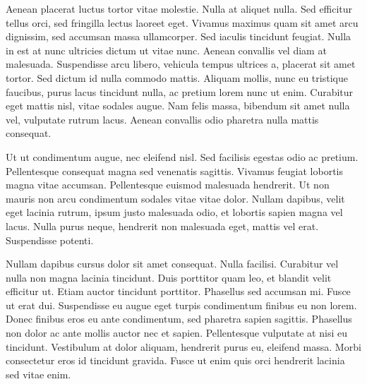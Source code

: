 \documentclass[
  a4paper,
  DIV=11,
  numbers=noendperiod]{scrreprt}
\begin{document}
Aenean placerat luctus tortor vitae molestie. Nulla at aliquet nulla.
Sed efficitur tellus orci, sed fringilla lectus laoreet eget. Vivamus
maximus quam sit amet arcu dignissim, sed accumsan massa ullamcorper.
Sed iaculis tincidunt feugiat. Nulla in est at nunc ultricies dictum ut
vitae nunc. Aenean convallis vel diam at malesuada. Suspendisse arcu
libero, vehicula tempus ultrices a, placerat sit amet tortor. Sed dictum
id nulla commodo mattis. Aliquam mollis, nunc eu tristique faucibus,
purus lacus tincidunt nulla, ac pretium lorem nunc ut enim. Curabitur
eget mattis nisl, vitae sodales augue. Nam felis massa, bibendum sit
amet nulla vel, vulputate rutrum lacus. Aenean convallis odio pharetra
nulla mattis consequat.

Ut ut condimentum augue, nec eleifend nisl. Sed facilisis egestas odio
ac pretium. Pellentesque consequat magna sed venenatis sagittis. Vivamus
feugiat lobortis magna vitae accumsan. Pellentesque euismod malesuada
hendrerit. Ut non mauris non arcu condimentum sodales vitae vitae dolor.
Nullam dapibus, velit eget lacinia rutrum, ipsum justo malesuada odio,
et lobortis sapien magna vel lacus. Nulla purus neque, hendrerit non
malesuada eget, mattis vel erat. Suspendisse potenti.

Nullam dapibus cursus dolor sit amet consequat. Nulla facilisi.
Curabitur vel nulla non magna lacinia tincidunt. Duis porttitor quam
leo, et blandit velit efficitur ut. Etiam auctor tincidunt porttitor.
Phasellus sed accumsan mi. Fusce ut erat dui. Suspendisse eu augue eget
turpis condimentum finibus eu non lorem. Donec finibus eros eu ante
condimentum, sed pharetra sapien sagittis. Phasellus non dolor ac ante
mollis auctor nec et sapien. Pellentesque vulputate at nisi eu
tincidunt. Vestibulum at dolor aliquam, hendrerit purus eu, eleifend
massa. Morbi consectetur eros id tincidunt gravida. Fusce ut enim quis
orci hendrerit lacinia sed vitae enim.


\nocite{*}
\end{document}
